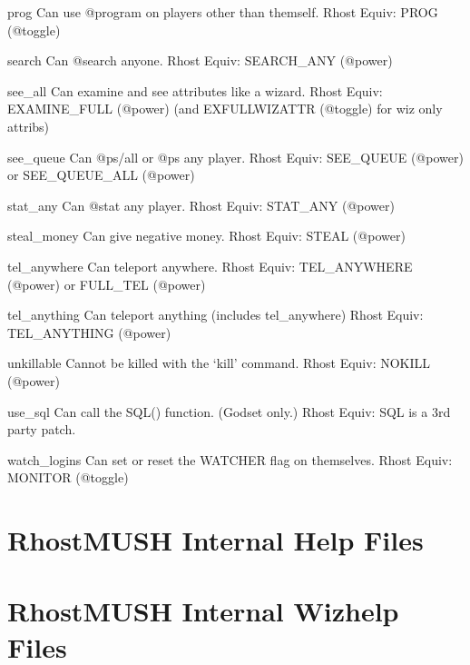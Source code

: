 \documentclass[letterpaper,10pt,english]{sphinxmanual}
\begin{document}
\sphinxAtStartPar
prog                  Can use @program on players other than themself.
Rhost Equiv: PROG (@toggle)

\sphinxAtStartPar
search                Can @search anyone.
Rhost Equiv: SEARCH\_ANY (@power)

\sphinxAtStartPar
see\_all               Can examine and see attributes like a wizard.
Rhost Equiv: EXAMINE\_FULL (@power) (and EXFULLWIZATTR (@toggle) for wiz only attribs)

\sphinxAtStartPar
see\_queue             Can @ps/all or @ps any player.
Rhost Equiv: SEE\_QUEUE (@power) or SEE\_QUEUE\_ALL (@power)

\sphinxAtStartPar
stat\_any              Can @stat any player.
Rhost Equiv: STAT\_ANY (@power)

\sphinxAtStartPar
steal\_money           Can give negative money.
Rhost Equiv: STEAL (@power)

\sphinxAtStartPar
tel\_anywhere          Can teleport anywhere.
Rhost Equiv: TEL\_ANYWHERE (@power) or FULL\_TEL (@power)

\sphinxAtStartPar
tel\_anything          Can teleport anything (includes tel\_anywhere)
Rhost Equiv: TEL\_ANYTHING (@power)

\sphinxAtStartPar
unkillable            Cannot be killed with the ‘kill’ command.
Rhost Equiv: NOKILL (@power)

\sphinxAtStartPar
use\_sql               Can call the SQL() function. (God\sphinxhyphen{}set only.)
Rhost Equiv: SQL is a 3rd party patch.

\sphinxAtStartPar
watch\_logins          Can set or reset the WATCHER flag on themselves.
Rhost Equiv: MONITOR (@toggle)


\chapter{RhostMUSH Internal Help Files}
\label{\detokenize{help:rhostmush-internal-help-files}}\label{\detokenize{help::doc}}



\chapter{RhostMUSH Internal Wizhelp Files}
\label{\detokenize{wizhelp:rhostmush-internal-wizhelp-files}}\label{\detokenize{wizhelp::doc}}
\end{document}
